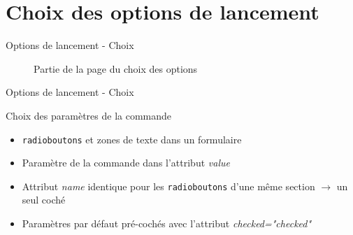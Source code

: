 \documentclass{beamer}
\begin{document}
\section{Choix des options de lancement}

\begin{frame}{\textcolor{bleu2}{\hspace{1cm}Options de lancement - Choix}}
	\begin{figure}
		\begin{center}
			\caption{Partie de la page du choix des options}
		\end{center}
	\end{figure}
\end{frame}

\begin{frame}[fragile]{\textcolor{bleu2}{\hspace{1cm}Options de lancement - Choix}}
	\begin{block}{\hspace{0.2cm}Choix des paramètres de la commande}
		\begin{itemize}
			\item \texttt{radioboutons} et zones de texte dans un formulaire
			\item Paramètre de la commande dans l'attribut \textit{value}
			\item Attribut \textit{name} identique pour les \texttt{radioboutons} d'une même section $\rightarrow$ un seul coché
			\item Paramètres par défaut pré-cochés avec l'attribut \textit{checked="checked"}
		\end{itemize}
	\end{block}
\end{frame}
\end{document}
